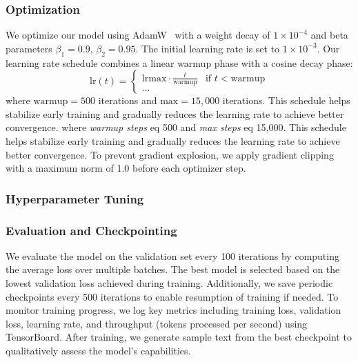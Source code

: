 \subsubsection{Optimization}
We optimize our model using AdamW~\cite{loshchilov2018decoupled} with a weight decay of $1 \times 10^{-4}$ and beta parameters $\beta_1 = 0.9$, $\beta_2 = 0.95$. The initial learning rate is set to $1 \times 10^{-3}$.
Our learning rate schedule combines a linear warmup phase with a cosine decay phase:
\begin{equation}
\text{lr}(t) =
\begin{cases}
\text{lr}{\text{max}} \cdot \frac{t}{\text{warmup}} & \text{if } t < \text{warmup} \\
\ldots
\end{cases}
\end{equation}
\noindent where $\text{warmup} = 500$ iterations and $\text{max} = 15,000$ iterations. This schedule helps stabilize early training and gradually reduces the learning rate to achieve better convergence.
\noindent where \textit{warmup steps} eq 500 and \textit{max steps} eq 15,000. This schedule helps stabilize early training and gradually reduces the learning rate to achieve better convergence.
To prevent gradient explosion, we apply gradient clipping with a maximum norm of 1.0 before each optimizer step.
\subsubsection{Hyperparameter Tuning}

\subsubsection{Evaluation and Checkpointing}
We evaluate the model on the validation set every 100 iterations by computing the average loss over multiple batches. The best model is selected based on the lowest validation loss achieved during training. Additionally, we save periodic checkpoints every 500 iterations to enable resumption of training if needed.
To monitor training progress, we log key metrics including training loss, validation loss, learning rate, and throughput (tokens processed per second) using TensorBoard. After training, we generate sample text from the best checkpoint to qualitatively assess the model's capabilities.
